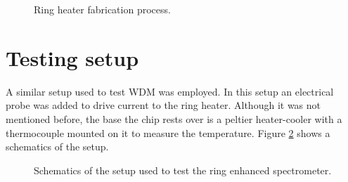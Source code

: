 \documentclass[12pt,twoside,english]{book}
\renewcommand{\~}{\perispomeni}%
\numberwithin{equation}{section}
\numberwithin{figure}{section}
\begin{document}
%
\begin{figure}[h]

\caption{Ring heater fabrication process.}
\label{fig:fabrication heater}
\end{figure}

\begin{figure}[h]
	\center{}
	\caption{}
\end{figure}


\section{Testing setup}
A similar setup used to test WDM was employed. In this setup an electrical probe was added to drive current to the ring heater. Although it was not mentioned before, the base the chip rests over is a peltier heater-cooler with a thermocouple mounted on it to measure the temperature. Figure \ref{fig:setup2} shows a schematics of the setup.
\begin{figure}[h]
\center{}
\caption{Schematics of the setup used to test the ring enhanced spectrometer.}
\label{fig:setup2}
\end{figure}
\end{document}
